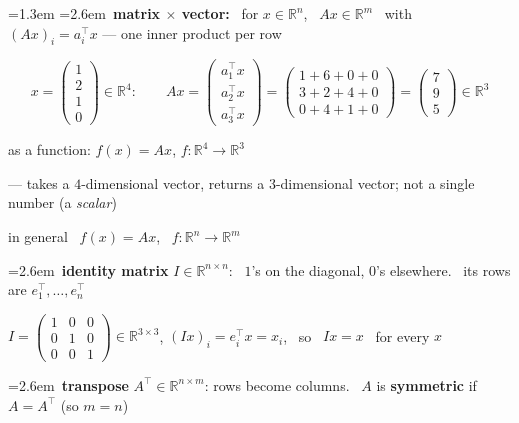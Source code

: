 \documentclass[10pt]{article}
\newenvironment{board}{%
  \par\vspace{4pt}
  \begingroup\leftskip=1.3em\relax\parskip=2pt\relax}{%
  \par\endgroup\vspace{4pt}}
\newcommand{\bul}{\hangindent=2.6em\hangafter=1\hspace{1.2em}\textbullet\ \ignorespaces}
\begin{document}
\begin{board}
\bul \textbf{matrix $\times$ vector:} \ for $x \in \mathbb{R}^n$, \ $Ax \in \mathbb{R}^m$ \ with \
$(Ax)_i = a_i^{\top}x$ \quad --- one inner product per row
\vspace{2pt}

\[
x = \begin{pmatrix} 1 \\ 2 \\ 1 \\ 0 \end{pmatrix} \in \mathbb{R}^4:
\qquad
Ax = \begin{pmatrix} a_1^{\top}x \\[2pt] a_2^{\top}x \\[2pt] a_3^{\top}x \end{pmatrix}
   = \begin{pmatrix} 1 + 6 + 0 + 0 \\ 3 + 2 + 4 + 0 \\ 0 + 4 + 1 + 0 \end{pmatrix}
   = \begin{pmatrix} 7 \\ 9 \\ 5 \end{pmatrix} \in \mathbb{R}^3
\]

\qquad as a function: \quad $f(x) = Ax$, \quad $f : \mathbb{R}^4 \to \mathbb{R}^3$
\vspace{2pt}

\qquad\qquad --- takes a $4$-dimensional vector, returns a $3$-dimensional vector; not a single number (a \emph{scalar})
\vspace{2pt}

\qquad\qquad in general \ $f(x) = Ax$, \ $f : \mathbb{R}^n \to \mathbb{R}^m$
\vspace{6pt}

\bul \textbf{identity matrix} $I \in \mathbb{R}^{n \times n}$: \ $1$'s on the diagonal, $0$'s elsewhere.
\ its rows are $e_1^{\top}, \dots, e_n^{\top}$
\vspace{2pt}

\qquad $I = \begin{pmatrix} 1 & 0 & 0 \\ 0 & 1 & 0 \\ 0 & 0 & 1 \end{pmatrix} \in \mathbb{R}^{3 \times 3}$,
\qquad $(Ix)_i = e_i^{\top}x = x_i$, \ so \ $Ix = x$ \ for every $x$
\vspace{6pt}

\bul \textbf{transpose} $A^{\top} \in \mathbb{R}^{n \times m}$: rows become columns. \
$A$ is \textbf{symmetric} if $A = A^{\top}$ (so $m = n$)
\vspace{10pt}


\end{board}
\end{document}
